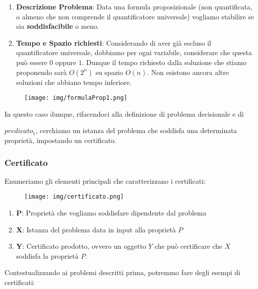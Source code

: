 \documentclass{article}
\begin{document}
\begin{enumerate}
    \item \textbf{Descrizione Problema}: Data una formula proposizionale (non quantificata, o almeno che non comprende il quantificatore universale) vogliamo stabilire se sia \textbf{soddisfacibile} o meno.
    \item \textbf{Tempo e Spazio richiesti}: Considerando di aver già escluso il quantificatore universale, dobbiamo per ogni variabile, considerare che questa può essere $0$ oppure $1$. Dunque il tempo richiesto dalla soluzione che stiamo proponendo sarà $O(2^{n})$ su spazio $O(n)$. Non esistono ancora altre soluzioni che abbiano tempo inferiore.
\end{enumerate}

\begin{figure}[htbp]
    \center
    \texttt{[image: img/formulaProp1.png]}
\end{figure}

\vskip 1cm

In questo caso dunque, rifacendoci alla definizione di problema decisionale e di 

$predicato_{1}$, cerchiamo un istanza del problema che soddisfa una determinata proprietà, impostando un certificato.

\newpage

\subsubsection{Certificato}

Enumeriamo gli elementi principali che caratterizzano i certificati:

\begin{figure}[htbp]
    \center
    \texttt{[image: img/certificato.png]}
\end{figure}

\begin{enumerate}
    \item \textbf{P}: Proprietà che vogliamo soddisfare dipendente dal problema
    \item \textbf{X}: Istanza del problema data in input alla proprietà $P$
    \item \textbf{Y}: Certificato prodotto, ovvero un oggetto $Y$ che può certificare che $X$ soddisfa la proprietà $P$.
\end{enumerate}

Contestualizzando ai problemi descritti prima, potremmo fare degli esempi di certificati:
\end{document}
